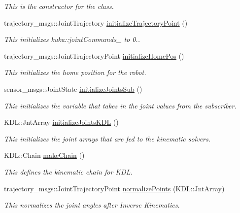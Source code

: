 \begin{DoxyCompactItemize}
\begin{DoxyCompactList}\small\item\em This is the constructor for the class. \end{DoxyCompactList}\item 
trajectory\+\_\+msgs\+::\+Joint\+Trajectory \hyperlink{classkuka_a86a4b26cfec17bf0919ac8758768b9c1}{initialize\+Trajectory\+Point} ()
\begin{DoxyCompactList}\small\item\em This initializes kuka\+::joint\+Commands\+\_\+ to 0.. \end{DoxyCompactList}\item 
trajectory\+\_\+msgs\+::\+Joint\+Trajectory\+Point \hyperlink{classkuka_afcf7e69ed9ef7a1a51f830ccaf320a4e}{initialize\+Home\+Pos} ()
\begin{DoxyCompactList}\small\item\em This initializes the home position for the robot. \end{DoxyCompactList}\item 
sensor\+\_\+msgs\+::\+Joint\+State \hyperlink{classkuka_a5ce8db8405b7decbad3ba449a7ad3731}{initialize\+Joints\+Sub} ()
\begin{DoxyCompactList}\small\item\em This initializes the variable that takes in the joint values from the subscriber. \end{DoxyCompactList}\item 
K\+D\+L\+::\+Jnt\+Array \hyperlink{classkuka_a12f118ede95479585988f4b25a67fb17}{initialize\+Joints\+K\+DL} ()
\begin{DoxyCompactList}\small\item\em This initializes the joint arrays that are fed to the kinematic solvers. \end{DoxyCompactList}\item 
K\+D\+L\+::\+Chain \hyperlink{classkuka_ab3c278ba250c7eda435f8dd801b5aca6}{make\+Chain} ()
\begin{DoxyCompactList}\small\item\em This defines the kinematic chain for K\+DL. \end{DoxyCompactList}\item 
trajectory\+\_\+msgs\+::\+Joint\+Trajectory\+Point \hyperlink{classkuka_ab1139c7fec434a2f8fa80f9358a5c9bc}{normalize\+Points} (K\+D\+L\+::\+Jnt\+Array)
\begin{DoxyCompactList}\small\item\em This normalizes the joint angles after Inverse Kinematics. \end{DoxyCompactList}\item 

\end{DoxyCompactItemize}
